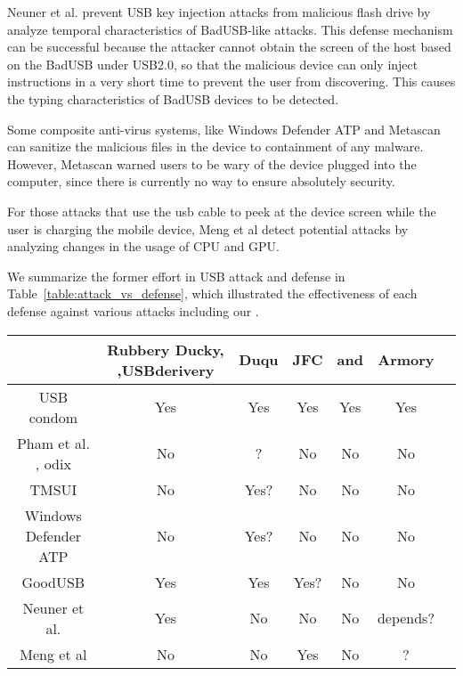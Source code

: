 Neuner et al.\cite{neuner2018usblock} prevent USB key injection attacks from malicious flash drive by analyze temporal characteristics of BadUSB-like attacks. This defense mechanism can be successful because the attacker cannot obtain the screen of the host based on the BadUSB under USB2.0, so that the malicious device can only inject instructions in a very short time to prevent the user from discovering. This causes the typing characteristics of BadUSB devices to be detected.

Some composite anti-virus systems, like Windows Defender ATP\cite{windenfender} and Metascan\cite{OPSWAT} can sanitize the malicious files in the device to containment of any malware. However, Metascan warned users to be wary of the device plugged into the computer, since there is currently no way to ensure absolutely security.


For those attacks that use the usb cable to peek at the device screen while the user is charging the mobile device, Meng et al\cite{meng2018252} detect potential attacks by analyzing changes in the usage of CPU and GPU.

We summarize the former effort in USB attack and defense in Table~\ref{table:attack_vs_defense}, which illustrated the effectiveness of each defense against various attacks including our \tool.
\begin{table*}
	\centering
	\begin{tabular}{|c|c|c|c|c|c|c|}
		
		
		\hline
		\diagbox {Defence}{Attack} & Rubbery Ducky\cite{rubber}, \cite{rubberducky2020},USBderivery\cite{usbdriver} & Duqu\cite{duqu} & JFC\cite{JFCImpact}&\cite{smartphone}\cite{poweremi} and \cite{usbdriver}& Armory\\
		
		\hline 
		USB condom \cite{Condom}& Yes & Yes & Yes & Yes & Yes\\
		\hline 
		Pham et al. \cite{pham2010optimizing}, odix\cite{OLEA}& No & ? & No & No & No\\
		\hline 
		TMSUI\cite{yang2015tmsui}& No & Yes? & No & No & No\\
		\hline 
		Windows Defender ATP\cite{windenfenderwhite}& No & Yes? & No & No & No\\
		\hline 
		GoodUSB\cite{tian2015defending}& Yes & Yes & Yes? & No & No \\

		\hline
		Neuner et al.\cite{neuner2018usblock}& Yes & No & No & No & depends? \\
		\hline
		Meng et al\cite{meng2018252}& No & No & Yes & No & ?\\
		\hline
	\end{tabular}
	\linebreak
	\caption{Effectiveness of defense against different attacks}
	\label{table:attack_vs_defense}
\end{table*}




